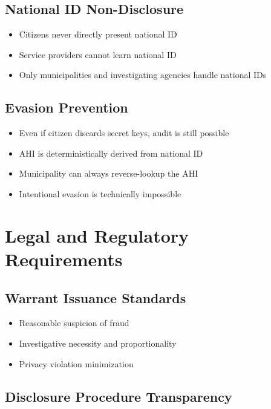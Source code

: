 \subsection{National ID Non-Disclosure}

\begin{itemize}
  \item Citizens never directly present national ID
  \item Service providers cannot learn national ID
  \item Only municipalities and investigating agencies handle national IDs
\end{itemize}

\subsection{Evasion Prevention}

\begin{itemize}
  \item Even if citizen discards secret keys, audit is still possible
  \item AHI is deterministically derived from national ID
  \item Municipality can always reverse-lookup the AHI
  \item Intentional evasion is technically impossible
\end{itemize}

\section{Legal and Regulatory Requirements}

\subsection{Warrant Issuance Standards}

\begin{itemize}
  \item Reasonable suspicion of fraud
  \item Investigative necessity and proportionality
  \item Privacy violation minimization
\end{itemize}

\subsection{Disclosure Procedure Transparency}

